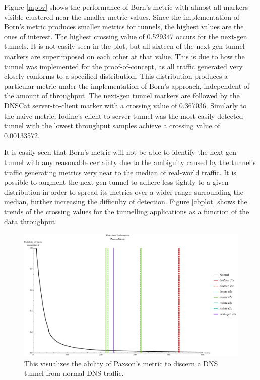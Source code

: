 \documentclass[12pt]{report}
\theoremstyle{remark}
\theoremstyle{definition}
\theoremstyle{definition}
\theoremstyle{definition}
\begin{document}
Figure \ref{mpbv} shows the performance of Born's metric with almost all markers
visible clustered near the smaller metric values. Since the implementation of
Born's metric produces smaller metrics for tunnels, the highest values are the
ones of interest. The highest crossing value of 0.529347 occurs for the next-gen
tunnels. It is not easily seen in the plot, but all sixteen of the next-gen
tunnel markers are superimposed on each other at that value. This is due to how
the tunnel was implemented for the proof-of-concept, as all traffic generated
very closely conforms to a specified distribution. This distribution produces a
particular metric under the implementation of Born's approach, independent of
the amount of throughput. The next-gen tunnel markers are followed by the DNSCat
server-to-client marker with a crossing value of 0.367036. Similarly to the
naive metric, Iodine's client-to-server tunnel was the most easily detected
tunnel with the lowest throughput samples achieve a crossing value of
0.00133572.

It is easily seen that Born's metric will not be able to identify the next-gen
tunnel with any reasonable certainty due to the ambiguity caused by the tunnel's
traffic generating metrics very near to the median of real-world traffic. It is
possible to augment the next-gen tunnel to adhere less tightly to a given
distribution in order to spread its metrics over a wider range surrounding the
median, further increasing the difficulty of detection. Figure \ref{cbplot}
shows the trends of the crossing values for the tunnelling applications as a
function of the data throughput.


\begin{figure}
\centering
\includegraphics[width=\textwidth]{figures/mppv-500.pdf}
\caption[Tunnel Detection Performance - Paxson's Metric]{This visualizes the
ability of Paxson's metric to discern a DNS tunnel from normal DNS traffic.}
\label{mppv}
\end{figure}
\end{document}
